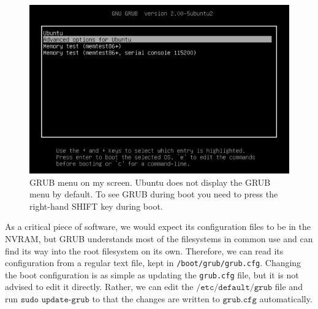 \documentclass{article}
\begin{document}
    \begin{figure}[H]
      \centering 
      \includegraphics[scale=0.4]{img/grub2-in-ubuntu.png}
      \caption{GRUB menu on my screen. Ubuntu does not display the GRUB menu by default. To see GRUB during boot you need to press the right-hand SHIFT key during boot. } 
      \label{fig:grub}
    \end{figure}


    As a critical piece of software, we would expect its configuration files to be in the NVRAM, but GRUB understands most of the filesystems in common use and can find its way into the root filesystem on its own. Therefore, we can read its configuration from a regular text file, kept in \texttt{/boot/grub/grub.cfg}. Changing the boot configuration is as simple as updating the \texttt{grub.cfg} file, but it is not advised to edit it directly. Rather, we can edit the $\texttt{/etc/default/grub}$ file and run $\texttt{sudo update-grub}$ to that the changes are written to $\texttt{grub.cfg}$ automatically.  
\end{document}
